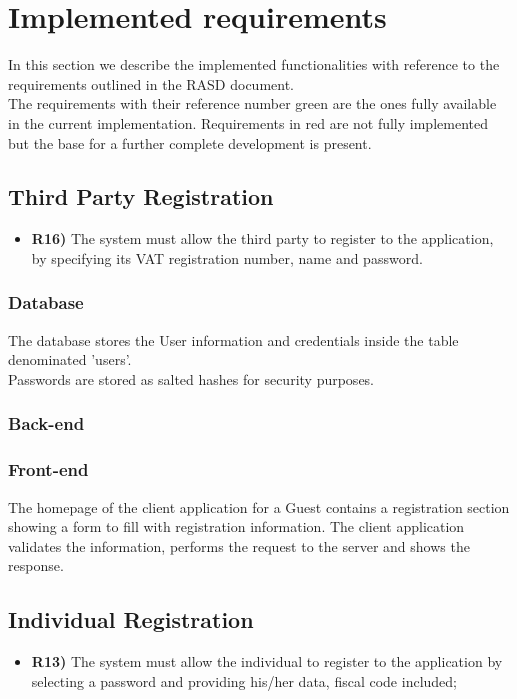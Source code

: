 \section{Implemented requirements}

In this section we describe the implemented functionalities with reference to the requirements outlined in the RASD document.\\
The requirements with their reference number green are the ones fully available in the current implementation. 
Requirements in red are not fully implemented but the base for a further complete development is present.

\subsection{Third Party Registration}
\begin{itemize}
	\item {\color{Green}\textbf{R16)}} The system must allow the third party to register to the application, by specifying its VAT registration number, name and password.
\end{itemize}
\subsubsection*{Database}
The database stores the User information and credentials inside the table denominated 'users'.\\
Passwords are stored as salted hashes for security purposes.

\subsubsection*{Back-end}


\subsubsection*{Front-end}
The homepage of the client application for a Guest contains a registration section showing a form to fill with registration information. The client application validates the information, performs the request to the server and shows the response.

\subsection{Individual Registration}
\begin{itemize}
	\item {\color{Green}\textbf{R13)}} The system must allow the individual to register to the application by selecting a password and providing his/her data, fiscal code included;
\end{itemize}

